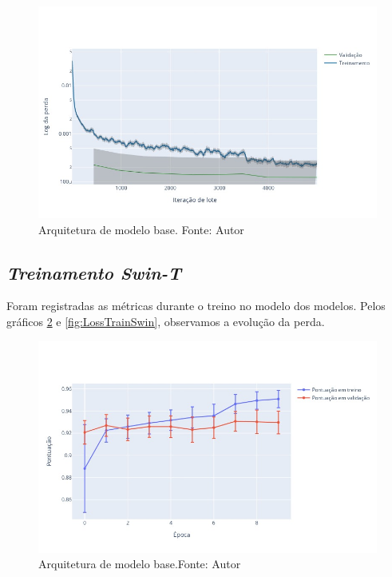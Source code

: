 \begin{figure}[!ht]
    \centering
    \includegraphics[width=\columnwidth]{Imagens/results/rsp-resnet-50_planet_pt/Training Loss Per Minibatch.jpg}
    \caption{ Arquitetura de modelo base. Fonte: Autor}
    \label{fig:TreinoResnetPerda}
\end{figure}


\subsection{\textit{Treinamento Swin-T}}\label{sec:Cap3_TrainSwinT}

Foram registradas as métricas durante o treino no modelo dos modelos. Pelos gráficos \ref{fig:PontuacaoTrainSwin} e \ref{fig:LossTrainSwin}, observamos a evolução da perda.

\begin{figure}[!ht]
    \centering
    \includegraphics[width=\columnwidth]{Imagens/results/rsp-swin-t_planet_pt/pontuação em treino e validação por época.jpg}
    \caption{ Arquitetura de modelo base.Fonte: Autor}
    \label{fig:PontuacaoTrainSwin}
\end{figure}  

